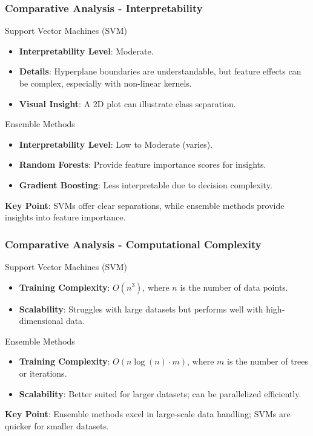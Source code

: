\documentclass[aspectratio=169]{beamer}
\begin{document}
\begin{frame}
    \frametitle{Comparative Analysis - Interpretability}
    \begin{block}{Support Vector Machines (SVM)}
        \begin{itemize}
            \item \textbf{Interpretability Level}: Moderate.
            \item \textbf{Details}: Hyperplane boundaries are understandable, but feature effects can be complex, especially with non-linear kernels.
            \item \textbf{Visual Insight}: A 2D plot can illustrate class separation.
        \end{itemize}
    \end{block}

    \begin{block}{Ensemble Methods}
        \begin{itemize}
            \item \textbf{Interpretability Level}: Low to Moderate (varies).
            \item \textbf{Random Forests}: Provide feature importance scores for insights.
            \item \textbf{Gradient Boosting}: Less interpretable due to decision complexity.
        \end{itemize}
    \end{block}
    
    \textbf{Key Point}: SVMs offer clear separations, while ensemble methods provide insights into feature importance.
\end{frame}

\begin{frame}
    \frametitle{Comparative Analysis - Computational Complexity}
    \begin{block}{Support Vector Machines (SVM)}
        \begin{itemize}
            \item \textbf{Training Complexity}: $O(n^3)$, where $n$ is the number of data points.
            \item \textbf{Scalability}: Struggles with large datasets but performs well with high-dimensional data.
        \end{itemize}
    \end{block}

    \begin{block}{Ensemble Methods}
        \begin{itemize}
            \item \textbf{Training Complexity}: $O(n \log(n) \cdot m)$, where $m$ is the number of trees or iterations.
            \item \textbf{Scalability}: Better suited for larger datasets; can be parallelized efficiently.
        \end{itemize}
    \end{block}
    
    \textbf{Key Point}: Ensemble methods excel in large-scale data handling; SVMs are quicker for smaller datasets.
\end{frame}
\end{document}
